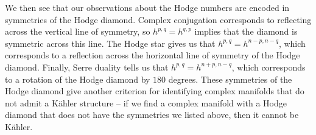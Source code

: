 \documentclass[psamsfonts, 12pt]{amsart}
\theoremstyle{definition}
\theoremstyle{remark}
\begin{document}

We then see that our observations about the Hodge numbers are encoded in symmetries
of the Hodge diamond. Complex conjugation corresponds to  reflecting across the
vertical line of symmetry, so $h^{p,q} = h^{q,p}$ implies that the diamond is
symmetric across this line. The Hodge star gives us that $h^{p,q} = h^{n-p,n-q}$,
which corresponds to a reflection across the horizontal line of symmetry of the Hodge
diamond. Finally, Serre duality tells us that $h^{p,q} = h^{n+p,n-q}$, which
corresponds to a rotation of the Hodge diamond by $180$ degrees. These symmetries of
the Hodge diamond give another criterion for identifying complex
manifolds that do not admit a K\"ahler structure -- if we find a complex manifold
with a Hodge diamond that does not have the symmetries we listed above, then it cannot
be K\"ahler.
%
\end{document}
